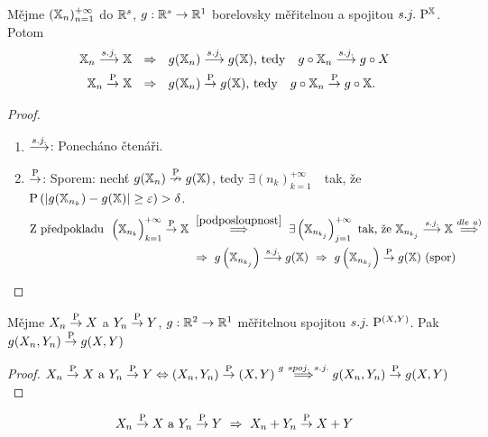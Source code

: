\begin{theorem}
	Mějme $(\X_n)_{n=1}^{+\infty}$ do $\R^s$, $g:\R^s\to\R^1$ borelovsky měřitelnou a spojitou $s.j.~\PP^\X$. Potom \[
	\begin{split}
	\X_n\sj \X~~&\Rightarrow~~g(\X_n)\sj g(\X)\text{, tedy~~~}g\circ \X_n \sj g\circ X \\
	\X_n\Pto \X~~&\Rightarrow~~g(\X_n)\Pto g(\X)\text{, tedy~~~}g\circ \X_n \Pto g\circ \X.
	\end{split}
	\]	
	\begin{proof}
		\begin{enumerate}[	a)]
			\item $\sj$: Ponecháno čtenáři.
			\item $\Pto$: Sporem: nechť $g(\X_n)\stackrel{\PP}{\nrightarrow}g(\X)$, tedy $\exists (n_k)_{k=1}^{+\infty}$~~tak, že~~$\PP\left( \left| g(\X_{n_k})-g(\X) \right|\geq \epsilon \right)>\delta$.
			\[
			\begin{split}
			\text{Z předpokladu~~}\Bigl(\X_{n_k}\Bigr)_{k=1}^{+\infty}\Pto \X~&\stackrel{\ref{podposloupnost}}{\Longrightarrow}~\exists \left( \X_{n_{k_j}} \right)_{j=1}^{+\infty}\text{ tak, že }\X_{n_{k_j}}\sj \X \stackrel{dle~a)}{~\Longrightarrow~}\\ &\Rightarrow~g\left( \X_{n_{k_j}} \right)\sj g(\X)~\Rightarrow~ g\left( \X_{n_{k_j}} \right)\Pto g(\X) \text{ (spor)} 
			\end{split}
			\]  
		\end{enumerate}
	\end{proof}
\end{theorem}
\begin{dusl}
	 Mějme $X_n\Pto X$ a $Y_n \Pto Y$, $g:\R^2\to\R^1$ měřitelnou spojitou $s.j.~\PP^{(X,Y)}$. Pak $g(X_n,Y_n)\Pto g(X,Y)$ \begin{proof}
		$X_n\Pto X\text{ a }Y_n \Pto Y\Leftrightarrow (X_n,Y_n)\Pto (X,Y)\stackrel{g~spoj.~s.j.}{\Longrightarrow}g(X_n,Y_n)\Pto g(X,Y)$
	\end{proof}
\end{dusl}
\begin{dusl}
	$$ X_n\Pto X\text{ a }Y_n \Pto Y ~\Rightarrow~ X_n+Y_n\Pto X+Y $$
\end{dusl}





